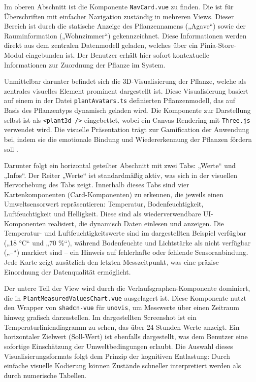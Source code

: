 Im oberen Abschnitt ist die Komponente \texttt{NavCard.vue} zu finden. Die ist für Überschriften mit einfacher Navigation zuständig in mehreren Views. Dieser Bereich ist durch die statische Anzeige des Pflanzennamens („Agave“) sowie der Rauminformation („Wohnzimmer“) gekennzeichnet. Diese Informationen werden direkt aus dem zentralen Datenmodell geladen, welches über ein Pinia-Store-Modul eingebunden ist. Der Benutzer erhält hier sofort kontextuelle Informationen zur Zuordnung der Pflanze im System.

Unmittelbar darunter befindet sich die 3D-Visualisierung der Pflanze, welche als zentrales visuelles Element prominent dargestellt ist. Diese Visualisierung basiert auf einem in der Datei \texttt{plantAvatars.ts} definierten Pflanzenmodell, das auf Basis des Pflanzentyps dynamisch geladen wird. Die Komponente zur Darstellung selbst ist als \texttt{<plant3d />} eingebettet, wobei ein Canvas-Rendering mit \texttt{Three.js} verwendet wird. Die visuelle Präsentation trägt zur Gamification der Anwendung bei, indem sie die emotionale Bindung und Wiedererkennung der Pflanzen fördern soll \cite{Werbach2012}.

Darunter folgt ein horizontal geteilter Abschnitt mit zwei Tabs: „Werte“ und „Infos“. Der Reiter „Werte“ ist standardmäßig aktiv, was sich in der visuellen Hervorhebung des Tabs zeigt. Innerhalb dieses Tabs sind vier Kartenkomponenten (Card-Komponenten) zu erkennen, die jeweils einen Umweltsensorwert repräsentieren: Temperatur, Bodenfeuchtigkeit, Luftfeuchtigkeit und Helligkeit. Diese sind als wiederverwendbare UI-Komponenten realisiert, die dynamisch Daten einlesen und anzeigen. Die Temperatur- und Luftfeuchtigkeitswerte sind im dargestellten Beispiel verfügbar („18 °C“ und „70 \%“), während Bodenfeuchte und Lichtstärke als nicht verfügbar („--“) markiert sind – ein Hinweis auf fehlerhafte oder fehlende Sensoranbindung. Jede Karte zeigt zusätzlich den letzten Messzeitpunkt, was eine präzise Einordnung der Datenqualität ermöglicht.

Der untere Teil der View wird durch die Verlaufsgraphen-Komponente dominiert, die in \texttt{PlantMeasuredValuesChart.vue} ausgelagert ist. Diese Komponente nutzt den Wrapper von \texttt{shadcn-vue} für \texttt{unovis}, um Messwerte über einen Zeitraum hinweg grafisch darzustellen. Im dargestellten Screenshot ist ein Temperaturliniendiagramm zu sehen, das über 24 Stunden  Werte anzeigt. Ein horizontaler Zielwert (Soll-Wert) ist ebenfalls dargestellt, was dem Benutzer eine sofortige Einschätzung der Umweltbedingungen erlaubt. Die Auswahl dieses Visualisierungsformats folgt dem Prinzip der kognitiven Entlastung: Durch einfache visuelle Kodierung können Zustände schneller interpretiert werden als durch numerische Tabellen.


